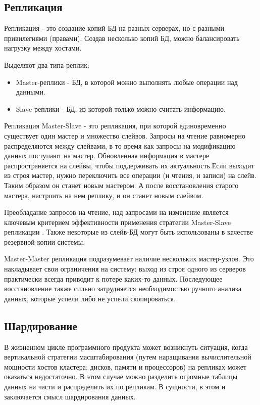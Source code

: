 \subsection{Репликация}

Репликация - это создание копий БД на разных серверах, но с разными привилегиями (правами). Создав несколько копий БД, можно балансировать нагрузку между хостами.

Выделяют два типа реплик:
\begin{itemize}
	\item Master-реплики - БД, в которой можно выполнять любые операции над данными.
	\item Slave-реплики - БД, из которой только можно считать информацию.
\end{itemize}

Репликация Master-Slave - это репликация, при которой единовременно существует один мастер и множество слейвов. Запросы на чтение равномерно распределяются между слейвами, в то время как запросы на модификацию данных поступают на мастер. Обновленная информация в мастере распространяется на слейвы, чтобы поддерживать их актуальность.Если выходит из строя мастер, нужно переключить все операции (и чтения, и записи) на слейв. Таким образом он станет новым мастером. А после восстановления старого мастера, настроить на нем реплику, и он станет новым слейвом.

Преобладание запросов на чтение, над запросами на изменение является ключевым критерием эффективности применения стратегии Master-Slave репликации \cite{replication}. Также некоторые из слейв-БД могут быть использованы в качестве резервной копии системы. 

Master-Master репликация подразумевает наличие нескольких мастер-узлов. Это накладывает свои ограничения на систему: выход из строя одного из серверов практически всегда приводит к потере каких-то данных. Последующее восстановление также сильно затрудняется необходимостью ручного анализа данных, которые успели либо не успели скопироваться. 



\subsection{Шардирование}

В жизненном цикле программного продукта может возникнуть ситуация, когда вертикальной стратегии масштабирования (путем наращивания вычислительной мощности хостов кластера: дисков, памяти и процессоров) на репликах может оказаться недостаточно. В этом случае можно разделить огромные таблицы данных на части и распределить их по репликам. В сущности, в этом и заключается смысл шардирования данных.

